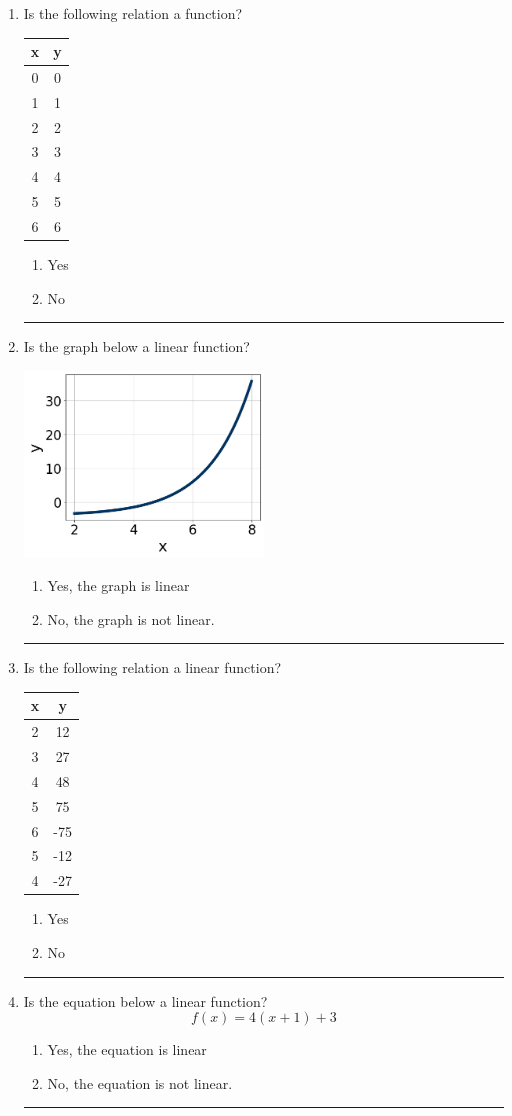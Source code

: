 \documentclass[14pt]{extbook}
\newcommand{\litem}[1]{\item#1\hspace*{-1cm}\rule{\textwidth}{0.4pt}}
\begin{document}
\begin{enumerate}
\litem{
Is the following relation a function?

\begin{tabular}{c|c}
x &y\tabularnewline \hline
0 &0\tabularnewline \hline
1 &1\tabularnewline \hline
2 &2\tabularnewline \hline
3 &3\tabularnewline \hline
4 &4\tabularnewline \hline
5 &5\tabularnewline \hline
6 &6\end{tabular}\begin{enumerate}[label=\Alph*.]
\item Yes
\item No

\end{enumerate} }
\litem{
Is the graph below a linear function?
\begin{center}
    \includegraphics[width=0.5\textwidth]{../Figures/MA_8_F_1_2_graphB.png}
\end{center}
\begin{enumerate}[label=\Alph*.]
\item Yes, the graph is linear
\item No, the graph is not linear.

\end{enumerate} }
\litem{
Is the following relation a linear function?

\begin{tabular}{c|c}
x &y\tabularnewline \hline
2 &12\tabularnewline \hline
3 &27\tabularnewline \hline
4 &48\tabularnewline \hline
5 &75\tabularnewline \hline
6 &-75\tabularnewline \hline
5 &-12\tabularnewline \hline
4 &-27\end{tabular}\begin{enumerate}[label=\Alph*.]
\item Yes
\item No

\end{enumerate} }
\litem{
Is the equation below a linear function?\[ f(x) = 4(x + 1)+3 \]\begin{enumerate}[label=\Alph*.]
\item Yes, the equation is linear
\item No, the equation is not linear.

\end{enumerate} }
\end{enumerate}
\end{document}
